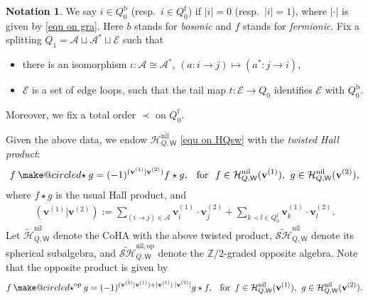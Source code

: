 \documentclass[10pt]{amsart}
\makeatletter
\theoremstyle{definition}
\newtheorem{Notation}[Theorem]{Notation}
\numberwithin{equation}{section}
\newcommand{\bZ}{\mathbb{Z}}
\newcommand{\bv}{\mathbf{v}}
\newcommand{\sW}{\mathsf{W}}
\newcommand{\ostar}{\mathbin{\mathpalette\make@circled\star}}
\newcommand{\make@circled}[2]{%
  \ooalign{$\m@th#1\smallbigcirc{#1}$\cr\hidewidth$\m@th#1#2$\hidewidth\cr}%
}
\newcommand{\smallbigcirc}[1]{%
  \vcenter{\hbox{\scalebox{0.77778}{$\m@th#1\bigcirc$}}}%
}
\makeatother
\begin{document}
\begin{Notation}
We say $i\in Q_0^{\mathrm b}$ (resp.~$i\in Q_0^{\mathrm f}$) if $|i|=0$ (resp.~$|i|=1$), where $|\cdot |$ is given by \eqref{equ on gra}. Here $b$ stands for \textit{bosonic} and $f$ stands for \textit{fermionic}.
Fix a splitting $Q_1=\mathcal A\sqcup \mathcal A^*\sqcup \mathcal E$ such that
\begin{itemize}
    \item there is an isomorphism $\iota\colon \mathcal A\cong \mathcal A^*$, $(a:i\to j)\mapsto (a^*:j\to i)$,
    \item $\mathcal E$ is a set of edge loops, such that the tail map $t\colon \mathcal E\to Q_0$ identifies $\mathcal E$ with $Q_0^{\mathrm b}$.
\end{itemize}
Moreover, we fix a total order $\prec$ on $Q_0^{\mathrm f}$.
\end{Notation}
Given the above data, we endow $\mathcal{H}^{\mathrm{nil}}_{Q,\sW}$ \eqref{equ on HQsw} with the \textit{twisted Hall product}:
\begin{align}\label{twi prod}
    f\ostar g=(-1)^{(\bv^{(1)}|\bv^{(2)})} f\star g,\,\,\,\;\text{for }\,\,f\in \mathcal{H}^{\mathrm{nil}}_{Q,\sW}(\bv^{(1)}),\,\: g\in \mathcal{H}^{\mathrm{nil}}_{Q,\sW}(\bv^{(2)}),
\end{align}
where $f\star g$ is the usual Hall product, and
\begin{align}\label{twist hall product}
    (\bv^{(1)}|\bv^{(2)}):=\sum_{(i\to j)\in \mathcal A}\bv^{(1)}_i\cdot\bv^{(2)}_j+\sum_{k\prec l\in Q_0^{\mathrm{f}}}\bv^{(1)}_k\cdot\bv^{(2)}_l.
\end{align}
Let $\widetilde{\mathcal{H}}^{\mathrm{nil}}_{Q,\sW}$ denote the CoHA with the above twisted product,  $\widetilde{\mathcal{SH}}^{\mathrm{nil}}_{Q,\sW}$ denote its spherical subalgebra, and $\widetilde{\mathcal{SH}}^{\mathrm{nil},\mathrm{op}}_{Q,\sW}$ denote the $\bZ/2$-graded opposite algebra. Note that the opposite product is given by
\begin{align*}
    f\ostar^{\mathrm{op}} g= (-1)^{(\bv^{(2)}|\bv^{(1)})+|\bv^{(1)}|\cdot |\bv^{(2)}|} g\star f,\,\,\,\;\text{for }\,f\in\mathcal{H}^{\mathrm{nil}}_{Q,\sW}(\bv^{(1)}),\,\: g\in \mathcal{H}^{\mathrm{nil}}_{Q,\sW}(\bv^{(2)}).
\end{align*}
\end{document}
